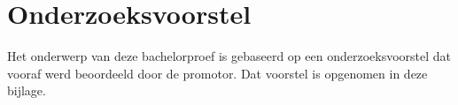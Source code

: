 \documentclass[fleqn,a4paper,12pt]{book}
\begin{document}






%
%




\appendix


\chapter{Onderzoeksvoorstel}

Het onderwerp van deze bachelorproef is gebaseerd op een onderzoeksvoorstel dat vooraf werd beoordeeld door de promotor. Dat voorstel is opgenomen in deze bijlage.



%


\printbibliography[heading=bibintoc]
\end{document}
